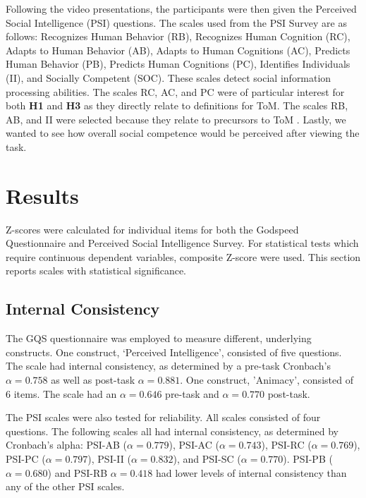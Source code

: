 \documentclass[letterpaper, 10 pt, conference]{ieeeconf}  %
\begin{document}
Following the video presentations, the participants were then given the Perceived Social Intelligence (PSI) questions. The scales used from the PSI Survey are as follows: Recognizes Human Behavior (RB), Recognizes Human Cognition (RC), Adapts to Human Behavior (AB), Adapts to Human Cognitions (AC), Predicts Human Behavior (PB), Predicts Human Cognitions (PC), Identifies Individuals (II), and Socially Competent (SOC). These scales detect social information processing abilities. The scales RC, AC, and PC were of particular interest for both \textbf{H1} and \textbf{H3} as they directly relate to definitions for ToM. The scales RB, AB, and II were selected because they relate to precursors to ToM \cite{scassellati2002theory}. Lastly, we wanted to see how overall social competence would be perceived after viewing the task.


\section{Results}
Z-scores were calculated for individual items for both the Godspeed Questionnaire and Perceived Social Intelligence Survey. For statistical tests which require continuous dependent variables, composite Z-score were used. This section reports scales with statistical significance.

\subsection{Internal Consistency}
The GQS questionnaire was employed to measure different, underlying constructs. One construct, `Perceived Intelligence', consisted of five questions. The scale had internal consistency, as determined by a pre-task Cronbach's $\alpha = 0.758$ as well as post-task $\alpha = 0.881$. One construct, 'Animacy', consisted of 6 items. The scale had an  $\alpha = 0.646$ pre-task and $\alpha = 0.770$ post-task.

The PSI scales were also tested for reliability. All scales consisted of four questions. The following scales all had internal consistency, as determined by Cronbach's alpha: PSI-AB ($\alpha = 0.779 $), PSI-AC ($\alpha = 0.743$), PSI-RC ($\alpha = 0.769$), PSI-PC ($\alpha = 0.797$), PSI-II ($\alpha = 0.832$), and PSI-SC ($\alpha = 0.770$).  PSI-PB ($\alpha = 0.680$) and PSI-RB $\alpha = 0.418$ had lower levels of internal consistency than any of the other PSI scales.
\end{document}
